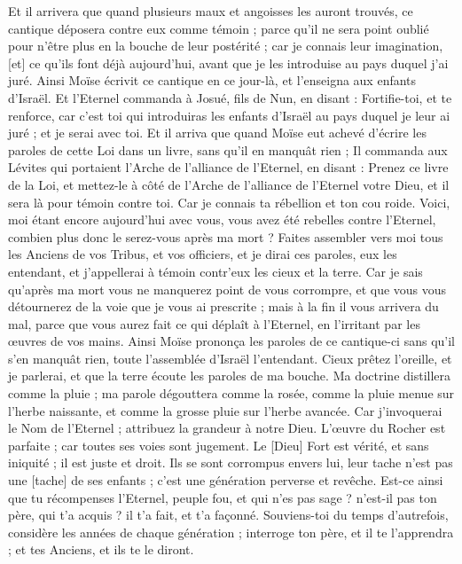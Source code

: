 \begin{multicols}{2}
Et il arrivera que quand plusieurs maux et angoisses les auront trouvés, ce cantique déposera contre eux comme témoin ; parce qu'il ne sera point oublié pour n'être plus en la bouche de leur postérité ; car je connais leur imagination, [et] ce qu'ils font déjà aujourd'hui, avant que je les introduise au pays duquel j'ai juré.
Ainsi Moïse écrivit ce cantique en ce jour-là, et l'enseigna aux enfants d'Israël.
Et l'Eternel commanda à Josué, fils de Nun, en disant : Fortifie-toi, et te renforce, car c'est toi qui introduiras les enfants d'Israël au pays duquel je leur ai juré ; et je serai avec toi.
Et il arriva que quand Moïse eut achevé d'écrire les paroles de cette Loi dans un livre, sans qu'il en manquât rien ;
Il commanda aux Lévites qui portaient l'Arche de l'alliance de l'Eternel, en disant :
Prenez ce livre de la Loi, et mettez-le à côté de l'Arche de l'alliance de l'Eternel votre Dieu, et il sera là pour témoin contre toi.
Car je connais ta rébellion et ton cou roide. Voici, moi étant encore aujourd'hui avec vous, vous avez été rebelles contre l'Eternel, combien plus donc le serez-vous après ma mort ?
Faites assembler vers moi tous les Anciens de vos Tribus, et vos officiers, et je dirai ces paroles, eux les entendant, et j'appellerai à témoin contr'eux les cieux et la terre.
Car je sais qu'après ma mort vous ne manquerez point de vous corrompre, et que vous vous détournerez de la voie que je vous ai prescrite ; mais à la fin il vous arrivera du mal, parce que vous aurez fait ce qui déplaît à l'Eternel, en l'irritant par les œuvres de vos mains.
Ainsi Moïse prononça les paroles de ce cantique-ci sans qu'il s'en manquât rien, toute l'assemblée d'Israël l'entendant.
\VerseOne{}Cieux prêtez l'oreille, et je parlerai, et que la terre écoute les paroles de ma bouche.
Ma doctrine distillera comme la pluie ; ma parole dégouttera comme la rosée, comme la pluie menue sur l'herbe naissante, et comme la grosse pluie sur l'herbe avancée.
Car j'invoquerai le Nom de l'Eternel ; attribuez la grandeur à notre Dieu.
L'œuvre du Rocher est parfaite ; car toutes ses voies sont jugement. Le [Dieu] Fort est vérité, et sans iniquité ; il est juste et droit.
Ils se sont corrompus envers lui, leur tache n'est pas une [tache] de ses enfants ; c'est une génération perverse et revêche.
Est-ce ainsi que tu récompenses l'Eternel, peuple fou, et qui n'es pas sage ? n'est-il pas ton père, qui t'a acquis ? il t'a fait, et t'a façonné.
Souviens-toi du temps d'autrefois, considère les années de chaque génération ; interroge ton père, et il te l'apprendra ; et tes Anciens, et ils te le diront.

\end{multicols}
